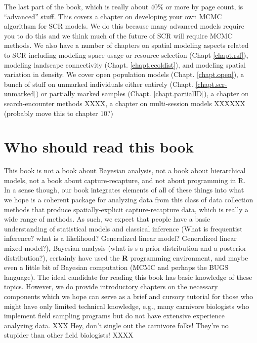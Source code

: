 The last part of the book, which is really about 40\% or more by page
count, is ``advanced'' stuff. This covers a chapter on developing your
own MCMC algorithsm for SCR models. We do this because many advanced
models require you to do this and we think much of the future of SCR
will require MCMC methods. 
We also have a number of chapters on spatial modeling aspects related
to SCR including modeling 
space usage or resource selection (Chapt \ref{chapt.rsf}), modeling
landscape connectivity (Chapt. \ref{chapt.ecoldist}), and modeling
spatial variation in density. 
We cover open population models (Chapt. \ref{chapt.open}),
a bunch of stuff on unmarked individuals either entirely (Chapt. \ref{chapt.scr-unmarked})
or partially marked samples (Chapt. \ref{chapt.partialID}), 
a chapter on search-encounter methods XXXX, a chapter on multi-session
models XXXXXX (probably move this to chapter 10?)








\section*{Who should read this book}

This book is not a book about Bayesian analysis, not a book about
hierarchical models, not a book about capture-recapture, and not about
programming in R. In a sense though, our book integrates elements of
all of these things into what we hope is a coherent package for
analyzing data from this class of data collection methods
that produce spatially-explicit capture-recapture data, which is really a wide range of methods.   As such, we
expect that people have a basic understanding of statistical models
and classical inference (What is frequentist inference? what is a
likelihood? Generalized linear model? Generalized linear mixed
model?), 
 Bayesian analysis (what is s a prior distribution and a
posterior distribution?),
certainly have used the {\bf R} programming environment,
and maybe even a little bit
of Bayesian
computation (MCMC and perhaps the BUGS language).
The ideal candidate for reading this book has basic knowledge of these
topics. However, we do provide introductory chapters on the necessary
components which we hope can serve as a brief and cursory tutorial for
those who might have only limited technical knowledge, e.g., many
carnivore biologists who implement field sampling programs but do not
have extensive experience analyzing data.
XXX Hey, don't single out the carnivore folks! They're no stupider than other field biologists! XXXX

